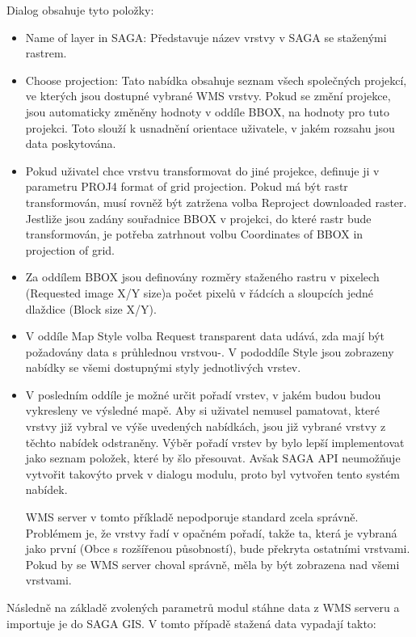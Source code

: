 \documentclass[a4paper,12pt]{article}
\begin{document}
Dialog obsahuje tyto položky:

\begin{itemize}
\item Name of layer in SAGA: Představuje název vrstvy v SAGA se
  staženými rastrem.
\item Choose projection: Tato nabídka obsahuje seznam všech společných
  projekcí, ve kterých jsou dostupné vybrané WMS vrstvy. Pokud se
  změní projekce, jsou automaticky změněny hodnoty v oddíle BBOX, na
  hodnoty pro tuto projekci. Toto slouží k usnadnění orientace
  uživatele, v jakém rozsahu jsou data poskytována.
\item Pokud uživatel chce vrstvu transformovat do jiné projekce,
  definuje ji v parametru PROJ4 format of grid projection. Pokud má
  být rastr transformován, musí rovněž být zatržena volba Reproject
  downloaded raster. Jestliže jsou zadány souřadnice BBOX v projekci,
  do které rastr bude transformován, je potřeba zatrhnout volbu
  Coordinates of BBOX in projection of grid.
\item Za oddílem BBOX jsou definovány rozměry staženého rastru v
  pixelech (Requested image X/Y size)a počet pixelů v řádcích a
  sloupcích jedné dlaždice (Block size X/Y).
\item V oddíle Map Style volba Request transparent data udává, zda
  mají být požadovány data s průhlednou vrstvou-.  V pododdíle Style
  jsou zobrazeny nabídky se všemi dostupnými styly jednotlivých
  vrstev.

\item V posledním oddíle je možné určit pořadí vrstev, v jakém budou
  budou vykresleny ve výsledné mapě. Aby si uživatel nemusel
  pamatovat, které vrstvy již vybral ve výše uvedených nabídkách, jsou
  již vybrané vrstvy z těchto nabídek odstraněny.  Výběr pořadí vrstev
  by bylo lepší implementovat jako seznam položek, které by šlo
  přesouvat. Avšak SAGA API neumožňuje vytvořit takovýto prvek v
  dialogu modulu, proto byl vytvořen tento systém nabídek.

WMS server v tomto příkladě nepodporuje standard zcela
správně. Problémem je, že vrstvy řadí v opačném pořadí, takže ta,
která je vybraná jako první (Obce s rozšířenou působností), bude
překryta ostatními vrstvami. Pokud by se WMS server choval správně,
měla by být zobrazena nad všemi vrstvami.
\end{itemize}

Následně na základě zvolených parametrů modul stáhne data z WMS
serveru a importuje je do SAGA GIS. V tomto případě stažená data
vypadají takto:
\end{document}
